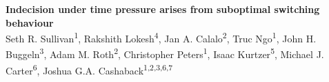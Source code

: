 \documentclass[12pt]{article}
\newcommand\boldblue[1]{\textcolor{mydarkblue}{\textbf{#1}}}
\begin{document}
\begin{center}

    \noindent\boldblue{\Large{Indecision under time pressure arises from suboptimal switching behaviour
        }}
    \vspace{4mm}
    \\
    Seth R. Sullivan\textsuperscript{1}, Rakshith Lokesh\textsuperscript{4}, Jan A. Calalo\textsuperscript{2}, Truc Ngo\textsuperscript{1}, John H. Buggeln\textsuperscript{3}, Adam M. Roth\textsuperscript{2}, Christopher Peters\textsuperscript{1}, Isaac Kurtzer\textsuperscript{5}, Michael J. Carter\textsuperscript{6}, Joshua G.A. Cashaback\textsuperscript{1,2,3,6,7}
    \vspace{1mm}
    \\
\end{center}
\end{document}
